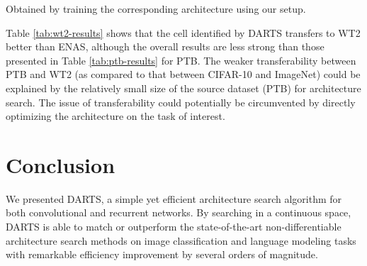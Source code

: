 \documentclass{article}
\begin{document}
 \begin{table}[t]
 \centering
 \caption{Comparison with state-of-the-art language models on WT2.}
 \label{tab:wt2-results}
 \begin{threeparttable}[b]
 \begin{tablenotes}
\item[] {\footnotesize Obtained by training the corresponding architecture using our setup.}
\end{tablenotes}
\end{threeparttable}
 \end{table}
 
Table \ref{tab:wt2-results}
shows that the cell identified by DARTS transfers to WT2 better than ENAS,
although the overall results are less strong than those presented in Table \ref{tab:ptb-results} for PTB.
The weaker transferability between PTB and WT2 (as compared to that between CIFAR-10 and ImageNet) could be explained by the relatively small size of the source dataset (PTB) for architecture search. The issue of transferability could potentially be circumvented by directly optimizing the architecture on the task of interest.
 
 \section{Conclusion}
We presented DARTS,
a simple yet efficient architecture search algorithm
for both convolutional and recurrent networks.
By searching in a continuous space,
DARTS is able to match or outperform the state-of-the-art 
non-differentiable architecture search methods on image classification and language modeling tasks with remarkable efficiency improvement by several orders of magnitude.
\end{document}

